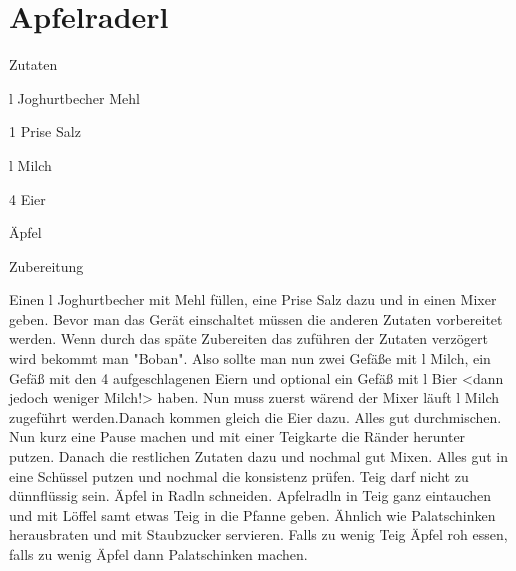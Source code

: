 \chapter*{Apfelraderl}
\begin{multicols}{2}
 {\Large Zutaten}
 \begin{Zutaten}
		\item {}l Joghurtbecher Mehl
		\item 1 Prise Salz
		\item {}l Milch
		\item 4 Eier
		\item Äpfel
		
		
		
		
\end{Zutaten}
	
\columnbreak
\end{multicols}

{\Large Zubereitung} \newline
\begin{addmargin}[1cm]{0cm}
	Einen l Joghurtbecher mit Mehl füllen, eine Prise Salz dazu und in einen Mixer geben.\newline
	Bevor man das Gerät einschaltet müssen die anderen Zutaten vorbereitet werden. Wenn durch das späte
	Zubereiten das zuführen der Zutaten verzögert wird bekommt man "Boban".\newline
	Also sollte man nun zwei Gefäße mit l Milch, ein Gefäß mit den 4 aufgeschlagenen Eiern und
	optional ein Gefäß mit l Bier <dann jedoch weniger Milch!> haben.
	Nun muss zuerst wärend der Mixer läuft l Milch zugeführt werden.\newline Danach kommen gleich die Eier
	dazu. Alles gut durchmischen.
	Nun kurz eine Pause machen und mit einer Teigkarte die Ränder herunter putzen.\newline
	Danach die restlichen Zutaten dazu und nochmal gut Mixen.
	Alles gut in eine Schüssel putzen und nochmal die konsistenz prüfen.
	Teig darf nicht zu dünnflüssig sein.\newline
	Äpfel in Radln schneiden.
	Apfelradln in Teig ganz eintauchen und mit Löffel samt etwas Teig in die Pfanne geben.\newline
	Ähnlich wie Palatschinken herausbraten und mit Staubzucker servieren.\newline
	Falls zu wenig Teig Äpfel roh essen, falls zu wenig Äpfel dann Palatschinken machen.
	
	
	
\end{addmargin}
